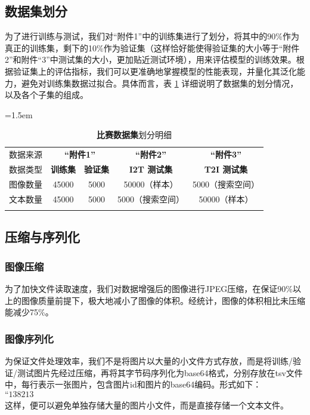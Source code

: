 \documentclass[a4paper]{zreport}
\begin{document}
\subsection{数据集划分}

为了进行训练与测试，我们对“附件1”中的训练集进行了划分，将其中的90\%作为真正的训练集，剩下的10\%作为验证集（这样恰好能使得验证集的大小等于“附件2”和附件“3”中测试集的大小，更加贴近测试环境），用来评估模型的训练效果。根据验证集上的评估指标，我们可以更准确地掌握模型的性能表现，并量化其泛化能力，避免对训练集数据过拟合。具体而言，表 \ref{tbl:DataSplit} 详细说明了数据集的划分情况，以及各个子集的组成。

\begin{table}[h]
\centering
\tabcolsep=1.5em
\renewcommand\arraystretch{1.5}
\caption{\textbf{比赛数据集}划分明细}
\vspace{1em}
\begin{tabular}{c|c|c|c|c}
    \Xhline{2pt}
    数据来源 & \multicolumn{2}{c|}{\textbf{“附件1”}} & \multicolumn{1}{c|}{\textbf{“附件2”}} & 
    \multicolumn{1}{c}{\textbf{“附件3”}}\\
    
    \Xhline{1.5pt}

    数据类型 & \textbf{训练集} & \textbf{验证集} & \textbf{I2T 测试集} & \textbf{T2I 测试集} \\
    \Xhline{0.4pt}
    图像数量 & {45000} & {5000} & {50000（样本）} & {5000（搜索空间）} \\
    \Xhline{0.4pt}
    文本数量 & {45000} & {5000} & {5000（搜索空间）} & {50000（样本）} \\

    \Xhline{2pt}
\end{tabular} \label{tbl:DataSplit}
\end{table}

\subsection{压缩与序列化}

\subsubsection{图像压缩}
为了加快文件读取速度，我们对数据增强后的图像进行JPEG压缩，在保证90\%以上的图像质量前提下，极大地减小了图像的体积。经统计，图像的体积相比未压缩能减少75\%。

\subsubsection{图像序列化}
为保证文件处理效率，我们不是将图片以大量的小文件方式存放，而是将训练/验证/测试图片先经过压缩，再将其字节码序列化为base64格式，分别存放在tsv文件中，每行表示一张图片，包含图片id和图片的base64编码。形式如下：$$\text{“138213	/9j/4AAQSkZJRgABAQAAAQABAAD/2wBDAAgGBgcGBQgHBwcJCQgKDBQ”}$$
这样，便可以避免单独存储大量的图片小文件，而是直接存储一个文本文件。
\end{document}

